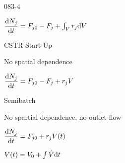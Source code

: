 \begin{mitframe}{083-4}
		

\begin{listone}

		\item $\dfrac{\mathrm{d}\nummoles_j}{\mathrm{d}\timet}=\force_{j0}-\force_j+\int_{\vol}\pos_j\mathrm{d}\vol$
    	
        	\begin{listtwo}
				
                \item CSTR Start-Up
                		
                        \begin{listthree}
                        
                        		\item No spatial dependence
                                
                                \item $\dfrac{\mathrm{d}\nummoles_j}{\mathrm{d}\timet}=\force_{j0}-\force_j+\pos_j\vol$
                                
                        	\end{listthree}
                            
                \item Semibatch
                		          
                            \begin{listthree}
                            
                            		\item No spartial dependence, no outlet flow
                                    
                                    \item $\dfrac{\mathrm{d}\nummoles_j}{\mathrm{d}\timet}=\force_{j\init}+\pos_{j}\vol(\timet)$
                                    
                                    		\begin{listfour}
                                            
                                            	\item $\vol(\timet)=\vol_0+\int\dot{\vol}\mathrm{d}\timet$
                                                
                                            \end{listfour}
          
                             \end{listthree}      
   
          \end{listtwo}

\end{listone}        

\end{mitframe}
